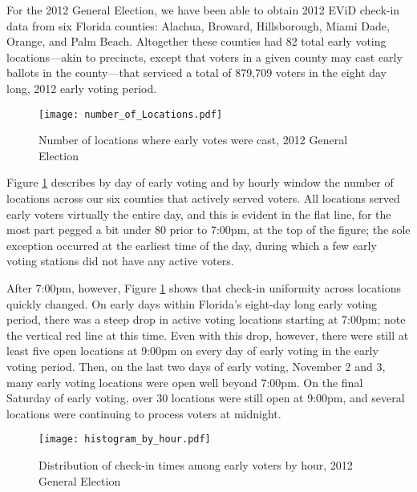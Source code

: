 \documentclass[12pt,titlepage]{article}
\begin{document}
For the 2012 General Election, we have been able to obtain 2012 EViD
check-in data from six Florida counties: Alachua, Broward,
Hillsborough, Miami Dade, Orange, and Palm Beach.  Altogether these
counties had 82 total early voting locations---akin to precincts,
except that voters in a given county may cast early ballots in the
county---that serviced a total of 879,709 voters in the eight day
long, 2012 early voting
period.  %



\begin{figure}[!ht]
  \caption{Number of locations where early votes were cast, 2012
    General Election}
  \label{fig:nrlocs2012}
  \centering
    \centering\texttt{[image: number\_of\_Locations.pdf]}
\end{figure}

Figure \ref{fig:nrlocs2012} describes by day of early voting and by
hourly window the number of locations across our six counties that
actively served voters.  All locations served early voters virtually
the entire day, and this is evident in the flat line, for the most
part pegged a bit under 80 prior to 7:00pm, at the top of the figure;
the sole exception occurred at the earliest time of the day, during
which a few early voting stations did not have any active voters.

After 7:00pm, however, Figure \ref{fig:nrlocs2012} shows that check-in
uniformity across locations quickly changed.  On early days within
Florida's eight-day long early voting period, there was a steep drop
in active voting locations starting at 7:00pm; note the vertical red
line at this time.  Even with this drop, however, there were still at
least five open locations at 9:00pm on every day of early voting in
the early voting period.  Then, on the last two days of early voting,
November 2 and 3, many early voting locations were open well beyond
7:00pm.  On the final Saturday of early voting, over 30 locations were
still open at 9:00pm, and several locations were continuing to process
voters at midnight.

\begin{figure}[!ht]
\caption{Distribution of check-in times among early voters by hour, 2012
  General Election}
  \label{fig:hist2012}
  \centering
    \centering\texttt{[image: histogram\_by\_hour.pdf]}
\end{figure}
\end{document}
